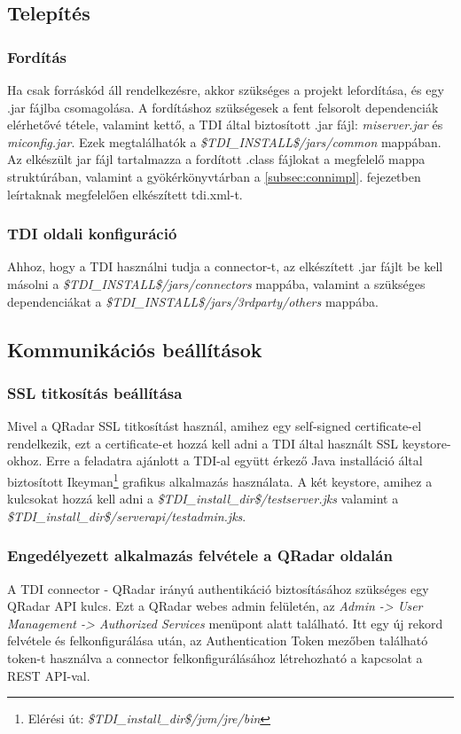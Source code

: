 \subsection{Telepítés}

\subsubsection{Fordítás}
Ha csak forráskód áll rendelkezésre, akkor szükséges a projekt lefordítása, és egy .jar fájlba csomagolása. A fordításhoz szükségesek a fent felsorolt dependenciák elérhetővé tétele, valamint kettő, a TDI által biztosított .jar fájl: \textit{miserver.jar} és \textit{miconfig.jar}. Ezek megtalálhatók a \textit{\$TDI\_INSTALL\$/jars/common} mappában. 
Az elkészült jar fájl tartalmazza a fordított .class fájlokat a megfelelő mappa struktúrában, valamint a gyökérkönyvtárban a \ref{subsec:connimpl}. fejezetben leírtaknak megfelelően elkészített tdi.xml-t.

\subsubsection{TDI oldali konfiguráció}
Ahhoz, hogy a TDI használni tudja a connector-t, az elkészített .jar fájlt be kell másolni a \textit{\$TDI\_INSTALL\$/jars/connectors} mappába, valamint a szükséges dependenciákat a \textit{\$TDI\_INSTALL\$/jars/3rdparty/others} mappába.
\subsection{Kommunikációs beállítások}

\subsubsection{SSL titkosítás beállítása}
Mivel a QRadar SSL titkosítást használ, amihez egy self-signed certificate-el rendelkezik, ezt a certificate-et hozzá kell adni a TDI által használt SSL keystore-okhoz. Erre a feladatra ajánlott a TDI-al együtt érkező Java installáció által biztosított Ikeyman\footnote{Elérési út: \textit{\$TDI\_install\_dir\$/jvm/jre/bin}} grafikus alkalmazás használata. A két keystore, amihez a kulcsokat hozzá kell adni a \textit{\$TDI\_install\_dir\$/testserver.jks} valamint a \textit{\$TDI\_install\_dir\$/serverapi/testadmin.jks}.\cite{qradarssl}

\subsubsection{Engedélyezett alkalmazás felvétele a QRadar oldalán }
A TDI connector - QRadar irányú authentikáció biztosításához szükséges egy QRadar API kulcs. Ezt a QRadar webes admin felületén, az \textit{Admin -> User Management -> Authorized Services} menüpont alatt található. Itt egy új rekord felvétele és felkonfigurálása után, az Authentication Token mezőben található token-t használva a connector felkonfigurálásához létrehozható a kapcsolat a REST API-val. 

